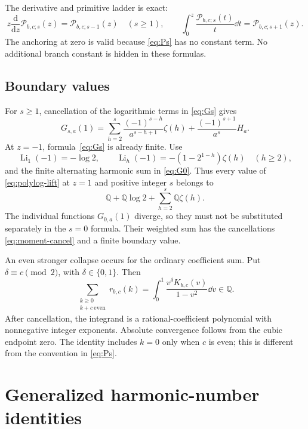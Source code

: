 \documentclass[11pt,letterpaper]{article}
\numberwithin{equation}{section}
\theoremstyle{plain}
\theoremstyle{definition}
\theoremstyle{remark}
\newcommand{\Q}{\mathbb Q}\newcommand{\C}{\mathbb C}\newcommand{\N}{\mathbb N}
\DeclareMathOperator{\Li}{Li}\DeclareMathOperator{\FP}{FP}
\begin{document}
The derivative and primitive ladder is exact:
\begin{equation}\label{eq:polylog-ladder}
 z\frac{\mathrm d}{\mathrm dz}\mathcal P_{b,c;s}(z)
 =\mathcal P_{b,c;s-1}(z)\quad(s\ge1),\qquad
 \int_0^z\frac{\mathcal P_{b,c;s}(t)}t\dd t
 =\mathcal P_{b,c;s+1}(z).
\end{equation}
The anchoring at zero is valid because \eqref{eq:Ps} has no constant term. No additional branch constant is hidden in these formulas.

\subsection{Boundary values}

For $s\ge1$, cancellation of the logarithmic terms in \eqref{eq:Gs} gives
\begin{equation}\label{eq:G1}
 G_{s,a}(1)=
 \sum_{h=2}^{s}\frac{(-1)^{s-h}}{a^{s-h+1}}\zeta(h)
 +\frac{(-1)^{s+1}}{a^s}H_a.
\end{equation}
At $z=-1$, formula~\eqref{eq:Gs} is already finite. Use
\[
 \Li_1(-1)=-\log2,\qquad
 \Li_h(-1)=-(1-2^{1-h})\zeta(h)\quad(h\ge2),
\]
and the finite alternating harmonic sum in \eqref{eq:G0}. Thus every value of \eqref{eq:polylog-lift} at $z=1$ and positive integer $s$ belongs to
\[
 \Q+\Q\log2+\sum_{h=2}^{s}\Q\zeta(h).
\]
The individual functions $G_{0,a}(1)$ diverge, so they must not be substituted separately in the $s=0$ formula. Their weighted sum has the cancellations \eqref{eq:moment-cancel} and a finite boundary value.

An even stronger collapse occurs for the ordinary coefficient sum. Put $\delta\equiv c\pmod2$, with $\delta\in\{0,1\}$. Then
\begin{equation}\label{eq:rational-collapse}
 \sum_{\substack{k\ge0\\k+c\ \mathrm{even}}}r_{b,c}(k)
 =\int_0^1\frac{v^\delta K_{b,c}(v)}{1-v^2}\dd v\in\Q.
\end{equation}
After cancellation, the integrand is a rational-coefficient polynomial with nonnegative integer exponents. Absolute convergence follows from the cubic endpoint zero. The identity includes $k=0$ only when $c$ is even; this is different from the convention in \eqref{eq:Ps}.



\section{Generalized harmonic-number identities}
\label{sec:harmonic}
\end{document}
